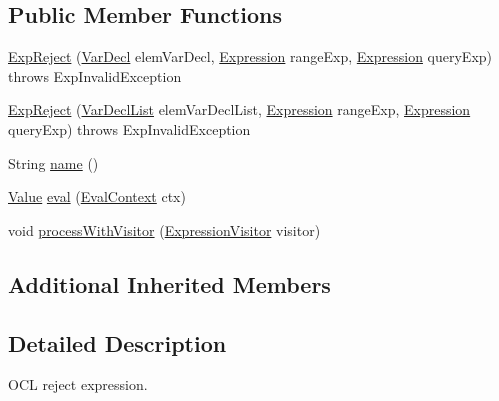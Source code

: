 \subsection*{Public Member Functions}
\begin{DoxyCompactItemize}
\item 
\hyperlink{classorg_1_1tzi_1_1use_1_1uml_1_1ocl_1_1expr_1_1_exp_reject_a541e79a981865f045a63e84ae354b6dc}{Exp\-Reject} (\hyperlink{classorg_1_1tzi_1_1use_1_1uml_1_1ocl_1_1expr_1_1_var_decl}{Var\-Decl} elem\-Var\-Decl, \hyperlink{classorg_1_1tzi_1_1use_1_1uml_1_1ocl_1_1expr_1_1_expression}{Expression} range\-Exp, \hyperlink{classorg_1_1tzi_1_1use_1_1uml_1_1ocl_1_1expr_1_1_expression}{Expression} query\-Exp)  throws Exp\-Invalid\-Exception     
\item 
\hyperlink{classorg_1_1tzi_1_1use_1_1uml_1_1ocl_1_1expr_1_1_exp_reject_a90d53d4ebd4ea2ffd6cb460b36483e6c}{Exp\-Reject} (\hyperlink{classorg_1_1tzi_1_1use_1_1uml_1_1ocl_1_1expr_1_1_var_decl_list}{Var\-Decl\-List} elem\-Var\-Decl\-List, \hyperlink{classorg_1_1tzi_1_1use_1_1uml_1_1ocl_1_1expr_1_1_expression}{Expression} range\-Exp, \hyperlink{classorg_1_1tzi_1_1use_1_1uml_1_1ocl_1_1expr_1_1_expression}{Expression} query\-Exp)  throws Exp\-Invalid\-Exception     
\item 
String \hyperlink{classorg_1_1tzi_1_1use_1_1uml_1_1ocl_1_1expr_1_1_exp_reject_a4b84c31bf8323892d8d2a1f8d343a4d0}{name} ()
\item 
\hyperlink{classorg_1_1tzi_1_1use_1_1uml_1_1ocl_1_1value_1_1_value}{Value} \hyperlink{classorg_1_1tzi_1_1use_1_1uml_1_1ocl_1_1expr_1_1_exp_reject_a91c3b1a024b59c816a2544350ca77239}{eval} (\hyperlink{classorg_1_1tzi_1_1use_1_1uml_1_1ocl_1_1expr_1_1_eval_context}{Eval\-Context} ctx)
\item 
void \hyperlink{classorg_1_1tzi_1_1use_1_1uml_1_1ocl_1_1expr_1_1_exp_reject_aef66d9b6733fb11d9aed9b93ae458dd8}{process\-With\-Visitor} (\hyperlink{interfaceorg_1_1tzi_1_1use_1_1uml_1_1ocl_1_1expr_1_1_expression_visitor}{Expression\-Visitor} visitor)
\end{DoxyCompactItemize}
\subsection*{Additional Inherited Members}


\subsection{Detailed Description}
O\-C\-L reject expression.

